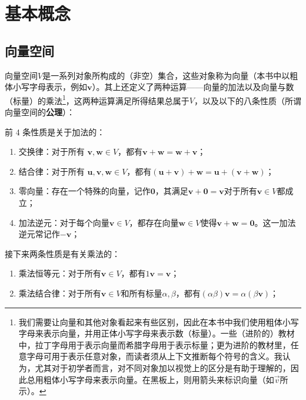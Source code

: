 

\chapter{基本概念}\label{chap:BasicNotion}

\section{向量空间}\label{sec:vector_space}

向量空间$V$是一系列对象所构成的（非空）集合，这些对象称为向量（本书中以粗体小写字母表示，例如$\mathbf{v}$）。其上还定义了两种运算——向量的加法以及向量与数（标量）的乘法\footnote{我们需要让向量和其他对象看起来有些区别，因此在本书中我们使用粗体小写字母来表示向量，并用正体小写字母来表示数（标量）。一些（进阶的）教材中，拉丁字母用于表示向量而希腊字母用于表示标量；更为进阶的教材里，任意字母可用于表示任意对象，而读者须从上下文推断每个符号的含义。我认为，尤其对于初学者而言，对不同对象加以视觉上的区分是有助于理解的，因此总用粗体小写字母来表示向量。在黑板上，则用箭头来标识向量（如$\vec{v}$所示）。}，这两种运算满足所得结果总属于$V$，以及以下的八条性质（所谓向量空间的{\bf 公理}）：

前 4 条性质是关于加法的：%
\begin{enumerate}
    \item 交换律：对于所有 $\mathbf{v},\mathbf{w}\in V$，都有$\mathbf{v} + \mathbf{w} = \mathbf{w} + \mathbf{v}$；
    \item 结合律：对于所有 $\mathbf{u},\mathbf{v},\mathbf{w}\in V$，都有$(\mathbf{u}+\mathbf{v})+\mathbf{w}=\mathbf{u}+(\mathbf{v}+\mathbf{w})$；
    \item 零向量：存在一个特殊的向量，记作$\mathbf{0}$，其满足$\mathbf{v}+\mathbf{0} = \mathbf{v}$对于所有$\mathbf{v}\in V$都成立；
    \item 加法逆元：对于每个向量$\mathbf{v}\in V$，都存在向量$\mathbf{w}\in V$使得$\mathbf{v}+\mathbf{w}=\mathbf{0}$。这一加法逆元常记作$-\mathbf{v}$；
\end{enumerate}

接下来两条性质是有关乘法的：

\begin{enumerate}[start=5]
    \item 乘法恒等元：对于所有$\mathbf{v}\in V$，都有$1\mathbf{v}=\mathbf{v}$；
    \item 乘法结合律：对于所有$\mathbf{v}\in V$和所有标量$\alpha,\beta$，都有$(\alpha\beta)\mathbf{v} = \alpha(\beta\mathbf{v})$；
\end{enumerate}


